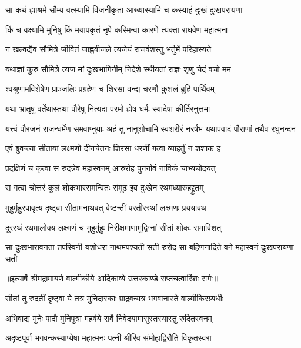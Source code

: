 \twolineshloka
{सा कथं ह्याश्रमे सौम्य वत्स्यामि विजनीकृता}
{आख्यास्यामि च कस्याहं दुःखं दुःखपरायणा} %

\twolineshloka
{किं च वक्ष्यामि मुनिषु किं मयापकृतं नृपे}
{कस्मिन्वा कारणे त्यक्ता राघवेण महात्मना} %

\twolineshloka
{न खल्वद्यैव सौमित्रे जीवितं जाह्नवीजले}
{त्यजेयं राजवंशस्तु भर्तुर्मे परिहास्यते} %

\twolineshloka
{यथाज्ञां कुरु सौमित्रे त्यज मां दुःखभागिनीम्}
{निदेशे स्थीयतां राज्ञः शृणु चेदं वचो मम} %

\twolineshloka
{श्वश्रूणामविशेषेण प्राञ्जलिः प्रग्रहेण च}
{शिरसा वन्द्य चरणौ कुशलं ब्रूहि पार्थिवम्} %

\twolineshloka
{यथा भ्रातृषु वर्तेथास्तथा पौरेषु नित्यदा}
{परमो ह्येष धर्मः स्यादेषा कीर्तिरनुत्तमा} %

\threelineshloka
{यत्त्वं पौरजनं राजन्धर्मेण समवाप्नुयाः}
{अहं तु नानुशोचामि स्वशरीरं नरर्षभ}
{यथापवादं पौराणां तथैव रघुनन्दन} %

\twolineshloka
{एवं ब्रुवन्त्यां सीतायां लक्ष्मणो दीनचेतनः}
{शिरसा धरणीं गत्वा व्याहर्तुं न शशाक ह} %

\twolineshloka
{प्रदक्षिणं च कृत्वा स रुदन्नेव महास्वनम्}
{आरुरोह पुनर्नावं नाविकं चाभ्यचोदयत्} %

\twolineshloka
{स गत्वा चोत्तरं कूलं शोकभारसमन्वितः}
{संमूढ इव दुःखेन रथमध्यारुहद्द्रुतम्} %

\twolineshloka
{मुहुर्मुहुरपावृत्य दृष्ट्वा सीतामनाथवत्}
{वेष्टन्तीं परतीरस्थां लक्ष्मणः प्रययावथ} %

\twolineshloka
{दूरस्थं रथमालोक्य लक्ष्मणं च मुहुर्मुहुः}
{निरीक्षमाणामुद्विग्नां सीतां शोकः समाविशत्} %

\fourlineindentedshloka
{सा दुःखभारावनता तपस्विनी}
{ यशोधरा नाथमपश्यती सती}
{रुरोद सा बर्हिणनादिते वने}
{ महास्वनं दुःखपरायणा सती} %


{॥इत्यार्षे श्रीमद्रामायणे वाल्मीकीये आदिकाव्ये उत्तरकाण्डे सप्तचत्वारिंशः सर्गः॥}


\twolineshloka
{सीतां तु रुदतीं दृष्ट्वा ये तत्र मुनिदारकाः}
{प्राद्रवन्यत्र भगवानास्ते वाल्मीकिरग्र्यधीः} %

\twolineshloka
{अभिवाद्य मुनेः पादौ मुनिपुत्रा महर्षये}
{सर्वे निवेदयामासुस्तस्यास्तु रुदितस्वनम्} %

\twolineshloka
{अदृष्टपूर्वा भगवन्कस्याप्येषा महात्मनः}
{पत्नी श्रीरिव संमोहाद्विरौति विकृतस्वरा} %

